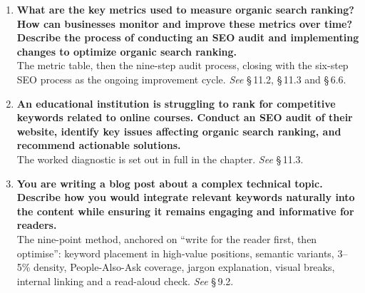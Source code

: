 \begin{enumerate}[leftmargin=2.2em,itemsep=1.4ex]
\item \textbf{What are the key metrics used to measure organic search ranking?
      How can businesses monitor and improve these metrics over time? Describe
      the process of conducting an SEO audit and implementing changes to optimize
      organic search ranking.} \\
      The metric table, then the nine-step audit process, closing with the
      six-step SEO process as the ongoing improvement cycle.
      \hfill\emph{See} \S\,11.2, \S\,11.3 and \S\,6.6.

\item \textbf{An educational institution is struggling to rank for competitive
      keywords related to online courses. Conduct an SEO audit of their website,
      identify key issues affecting organic search ranking, and recommend
      actionable solutions.} \\
      The worked diagnostic is set out in full in the chapter.
      \hfill\emph{See} \S\,11.3.

\item \textbf{You are writing a blog post about a complex technical topic.
      Describe how you would integrate relevant keywords naturally into the
      content while ensuring it remains engaging and informative for readers.}
      \\
      The nine-point method, anchored on ``write for the reader first, then
      optimise'': keyword placement in high-value positions, semantic variants,
      3--5\% density, People-Also-Ask coverage, jargon explanation, visual
      breaks, internal linking and a read-aloud check.
      \hfill\emph{See} \S\,9.2.


\end{enumerate}

